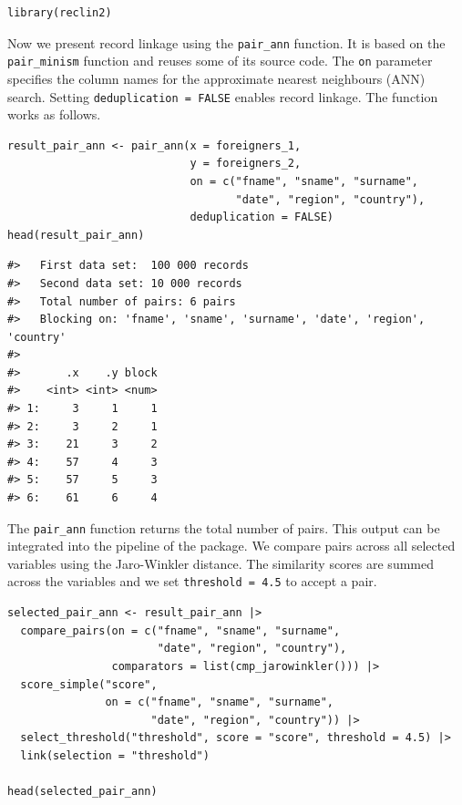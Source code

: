 \begin{verbatim}
library(reclin2)
\end{verbatim}

Now we present record linkage using the \texttt{pair\_ann} function. It is based on the \linebreak \texttt{pair\_minism} function and reuses some of its source code. The \texttt{on} parameter specifies the column names for the approximate nearest neighbours (ANN) search. Setting \texttt{deduplication\ =\ FALSE} enables record linkage. The function works as follows.

\begin{verbatim}
result_pair_ann <- pair_ann(x = foreigners_1,
                            y = foreigners_2,
                            on = c("fname", "sname", "surname",
                                   "date", "region", "country"),
                            deduplication = FALSE)
head(result_pair_ann)
\end{verbatim}

\begin{verbatim}
#>   First data set:  100 000 records
#>   Second data set: 10 000 records
#>   Total number of pairs: 6 pairs
#>   Blocking on: 'fname', 'sname', 'surname', 'date', 'region', 'country'
#> 
#>       .x    .y block
#>    <int> <int> <num>
#> 1:     3     1     1
#> 2:     3     2     1
#> 3:    21     3     2
#> 4:    57     4     3
#> 5:    57     5     3
#> 6:    61     6     4
\end{verbatim}

The \texttt{pair\_ann} function returns the total number of pairs. This output can be integrated into the pipeline of the  package. We compare pairs across all selected variables using the Jaro-Winkler distance. The similarity scores are summed across the variables and we set \texttt{threshold\ =\ 4.5} to accept a pair.

\begin{verbatim}
selected_pair_ann <- result_pair_ann |>
  compare_pairs(on = c("fname", "sname", "surname",
                       "date", "region", "country"),
                comparators = list(cmp_jarowinkler())) |>
  score_simple("score",
               on = c("fname", "sname", "surname",
                      "date", "region", "country")) |>
  select_threshold("threshold", score = "score", threshold = 4.5) |>
  link(selection = "threshold")

head(selected_pair_ann)
\end{verbatim}

